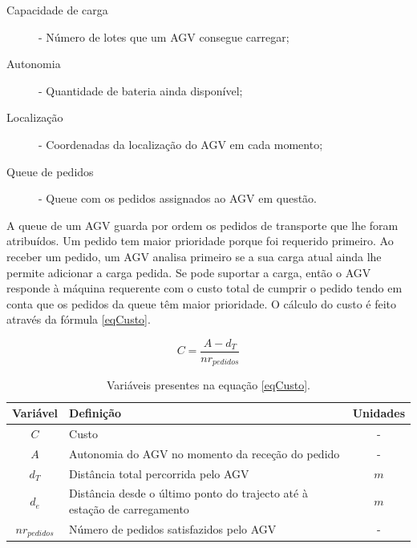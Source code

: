 \begin{titlepage}
\begin{description}
\item[Capacidade de carga] - Número de lotes que um AGV consegue carregar;
\item[Autonomia] - Quantidade de bateria ainda disponível;
\item[Localização] - Coordenadas da localização do AGV em cada momento;
\item[Queue de pedidos] - Queue com os pedidos assignados ao AGV em questão.
\end{description}

A queue de um AGV guarda por ordem os pedidos de transporte que lhe foram atribuídos. Um pedido tem maior prioridade porque foi requerido primeiro. Ao receber um pedido, um AGV analisa primeiro se a sua carga atual ainda lhe permite adicionar a carga pedida. Se pode suportar a carga, então o AGV responde à máquina requerente com o custo total de cumprir o pedido tendo em conta que os pedidos da queue têm maior prioridade. O cálculo do custo é feito através da fórmula \ref{eqCusto}.

\begin{equation}
C = \frac{A-d_{T}}{nr_{pedidos}}
\label{eqCusto}
\end{equation}

\begin{table}[H]
\centering
\caption{Variáveis presentes na equação \ref{eqCusto}.}
\label{my-label}
\begin{tabular}{@{}p{2cm}ll@{}}
\toprule
\multicolumn{1}{c}{\textbf{Variável}} & \textbf{Definição}   & \multicolumn{1}{c}{\textbf{Unidades}} \\ \midrule
\multicolumn{1}{c}{$C$} & Custo &  \multicolumn{1}{c}{-}  \\ \midrule
\multicolumn{1}{c}{$A$} & Autonomia do AGV no momento da receção do pedido &  \multicolumn{1}{c}{-}  \\ \midrule
\multicolumn{1}{c}{$d_{T}$} & Distância total percorrida pelo AGV   & \multicolumn{1}{c}{$m$} \\ \midrule
\multicolumn{1}{c}{$d_{e}$} & Distância desde o último ponto do trajecto até à estação de carregamento & \multicolumn{1}{c}{$m$} \\ \midrule
\multicolumn{1}{c}{$nr_{pedidos}$} & Número de pedidos satisfazidos pelo AGV  & \multicolumn{1}{c}{-} \\ \bottomrule
\end{tabular}
\end{table}


\end{titlepage}
